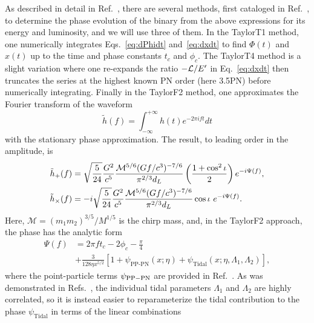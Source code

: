 \documentclass[twocolumn,prd,amssymb,aps,nofootinbib,showpacs,epsf]{revtex4}
\begin{document}
As described in detail in Ref.~\cite{WadeCreightonOchsner2014}, there are several methods, first cataloged in Ref.~\cite{DamourIyerSathyaprakash2001}, to determine the phase evolution of the binary from the above expressions for its energy and luminosity, and we will use three of them.  In the TaylorT1 method, one numerically integrates Eqs.~\eqref{eq:dPhidt} and~\eqref{eq:dxdt} to find $\Phi(t)$ and $x(t)$ up to the time and phase constants $t_c$ and $\phi_c$. The TaylorT4 method is a slight variation where one re-expands the ratio $-{\cal L}/E^\prime$ in Eq.~\eqref{eq:dxdt} then truncates the series at the highest known PN order (here 3.5PN) before numerically integrating. Finally in the TaylorF2 method, one approximates the Fourier transform of the waveform
\begin{equation}
\tilde{h}(f)=\int_{-\infty}^{+\infty} h(t) e^{-2\pi i f t}dt
\end{equation}
with the stationary phase approximation. The result, to leading order in the amplitude, is
\begin{align}
\label{eq:hoffp}
\tilde{h}_+(f) &= \sqrt{\frac{5}{24}}\frac{G^2}{c^5}\frac{{\cal M}^{5/6}(Gf/c^3)^{-7/6}}{\pi^{2/3}d_L}\left(\frac{1+\cos^2\iota}{2}\right)e^{-i\Psi(f)},\\
\label{eq:hoffc}
\tilde{h}_\times(f) &= -i\sqrt{\frac{5}{24}}\frac{G^2}{c^5}\frac{{\cal M}^{5/6}(Gf/c^3)^{-7/6}}{\pi^{2/3}d_L}\cos\iota\mbox{ }e^{-i\Psi(f)}.
\end{align}
Here, $\mathcal{M} = (m_1 m_2)^{3/5}/M^{1/5}$ is the chirp mass, and, in the TaylorF2 approach, the phase has the analytic form 
\begin{equation}
\begin{split}
\Psi(f) &= 2\pi f t_c - 2\phi_c -\frac{\pi}{4}\\
& +\frac{3}{128\eta x^{5/2}}\left[1+\psi_\text{PP-PN}(x; \eta)+\psi_\text{Tidal}(x; \eta, \Lambda_1, \Lambda_2)\right],
\end{split}
\end{equation}
where the point-particle terms $\psi_{\rm PP-PN}$ are provided in Ref.~\cite{BuonannoIyerOchsner2009}. As was demonstrated in Refs.~\cite{FlanaganHinderer2008, Favata2014, WadeCreightonOchsner2014}, the individual tidal parameters $\Lambda_1$ and $\Lambda_2$ are highly correlated, so it is instead easier to reparameterize the tidal contribution to the phase $\psi_\text{Tidal}$ in terms of the linear combinations
\end{document}
